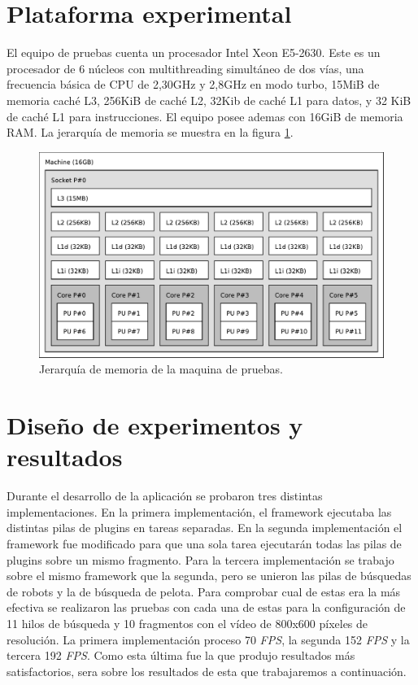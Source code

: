\section{Plataforma experimental}

\label{plataformaExperimental}

El equipo de pruebas cuenta un procesador Intel Xeon E5-2630. Este es un
procesador de 6 núcleos con multithreading simultáneo de dos vías, una
frecuencia básica de CPU de 2,30GHz y 2,8GHz en modo turbo, 15MiB de memoria
caché L3, 256KiB de caché L2, 32Kib de caché L1 para datos, y 32 KiB de caché L1
para instrucciones. El equipo posee ademas con 16GiB de memoria RAM. La
jerarquía de memoria se muestra en la figura \ref{topoMemoria}.

\begin{figure}[!ht]

	\includegraphics[width=\textwidth]{img/topo.pdf}
	\caption{Jerarquía de memoria de la maquina de pruebas.}

	\label{topoMemoria}

\end{figure}

\section{Diseño de experimentos y resultados}

\label{resultados}

Durante el desarrollo de la aplicación se probaron tres distintas
implementaciones. En la primera implementación, el framework ejecutaba las
distintas pilas de plugins en tareas separadas. En la segunda implementación el
framework fue modificado para que una sola tarea ejecutarán todas las pilas de
plugins sobre un mismo fragmento. Para la tercera implementación se trabajo
sobre el mismo framework que la segunda, pero se unieron las pilas de búsquedas
de robots y la de búsqueda de pelota. Para comprobar cual de estas era la más
efectiva se realizaron las pruebas con cada una de estas para la configuración
de 11 hilos de búsqueda y 10 fragmentos con el vídeo de 800x600 píxeles de
resolución. La primera implementación proceso 70 \emph{FPS}, la segunda 152
\emph{FPS} y la tercera 192 \emph{FPS}. Como esta última fue la que produjo
resultados más satisfactorios, sera sobre los resultados de esta que
trabajaremos a continuación.

